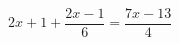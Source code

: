 \begin{ex}[type=equation]
	\begin{condition}
		$2x + 1 +\dfrac{2x - 1}{6} = \dfrac{7x - 13}{4}$
	\end{condition}
\end{ex}